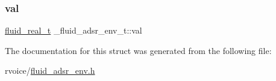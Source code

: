\subsubsection{\texorpdfstring{val}{val}}
{\footnotesize\ttfamily \hyperlink{fluidsynth__priv_8h_a9e96f0917747b69cabb7c671bc693dbb}{fluid\+\_\+real\+\_\+t} \+\_\+fluid\+\_\+adsr\+\_\+env\+\_\+t\+::val}



The documentation for this struct was generated from the following file\+:\begin{DoxyCompactItemize}
\item 
rvoice/\hyperlink{fluid__adsr__env_8h}{fluid\+\_\+adsr\+\_\+env.\+h}\end{DoxyCompactItemize}
